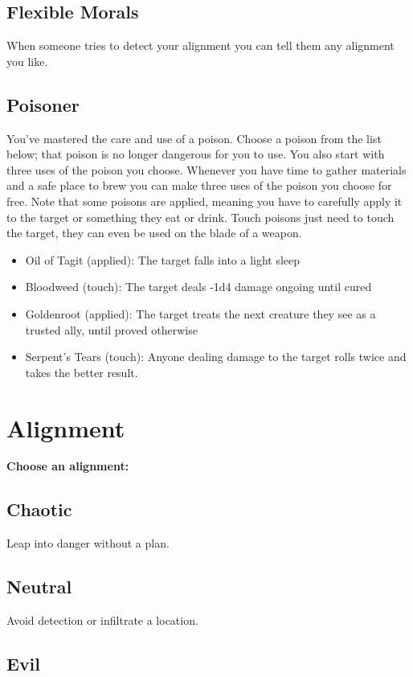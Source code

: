 \subsection{Flexible Morals}

When someone tries to detect your alignment you can tell them any alignment you like.
\subsection{Poisoner}

You've mastered the care and use of a poison. Choose a poison from the list below; that poison is no longer dangerous for you to use. You also start with three uses of the poison you choose. Whenever you have time to gather materials and a safe place to brew you can make three uses of the poison you choose for free. Note that some poisons are applied, meaning you have to carefully apply it to the target or something they eat or drink. Touch poisons just need to touch the target, they can even be used on the blade of a weapon.
\begin{itemize}
\item Oil of Tagit (applied): The target falls into a light sleep
\item Bloodweed (touch): The target deals -1d4 damage ongoing until cured
\item Goldenroot (applied): The target treats the next creature they see as a trusted ally, until proved otherwise
\item Serpent's Tears (touch): Anyone dealing damage to the target rolls twice and takes the better result.

\end{itemize}
\section*{Alignment}

{\bfseries Choose an alignment:}
\subsection{Chaotic}

Leap into danger without a plan.
\subsection{Neutral}

Avoid detection or infiltrate a location.
\subsection{Evil}

